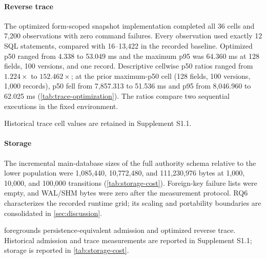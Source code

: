 \paragraph{Reverse trace}
The optimized form-scoped snapshot implementation completed all 36 cells and 7,200 observations with zero command failures. Every observation used exactly 12 SQL statements, compared with 16--13,422 in the recorded baseline. Optimized p50 ranged from 4.338 to 53.049 ms and the maximum p95 was 64.360 ms at 128 fields, 100 versions, and one record. Descriptive cellwise p50 ratios ranged from $1.224\times$ to $152.462\times$; at the prior maximum-p50 cell (128 fields, 100 versions, 1,000 records), p50 fell from 7,857.313 to 51.536 ms and p95 from 8,046.960 to 62.025 ms (\cref{tab:trace-optimization}). The ratios compare two sequential executions in the fixed environment.



Historical trace cell values are retained in Supplement S1.1.

\paragraph{Storage}
The incremental main-database sizes of the full authority schema relative to the lower population were 1,085,440, 10,772,480, and 111,230,976 bytes at 1,000, 10,000, and 100,000 transitions (\cref{tab:storage-cost}). Foreign-key failure lists were empty, and WAL/SHM bytes were zero after the measurement protocol. RQ6 characterizes the recorded runtime grid; its scaling and portability boundaries are consolidated in \cref{sec:discussion}.



 foregrounds persistence-equivalent admission and optimized reverse trace. Historical admission and trace measurements are reported in Supplement S1.1; storage is reported in \cref{tab:storage-cost}.


